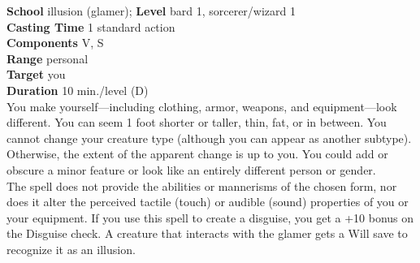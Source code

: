 \textbf{School} illusion (glamer); \textbf{Level} bard 1, sorcerer/wizard 1\\
\textbf{Casting Time} 1 standard action\\
\textbf{Components} V, S\\
\textbf{Range} personal\\
\textbf{Target} you\\
\textbf{Duration} 10 min./level (D)\\
You make yourself---including clothing, armor, weapons, and equipment---look different. You can seem 1 foot shorter or taller, thin, fat, or in between. You cannot change your creature type (although you can appear as another subtype). Otherwise, the extent of the apparent change is up to you. You could add or obscure a minor feature or look like an entirely different person or gender.\\
The spell does not provide the abilities or mannerisms of the chosen form, nor does it alter the perceived tactile (touch) or audible (sound) properties of you or your equipment. If you use this spell to create a disguise, you get a +10 bonus on the Disguise check. A creature that interacts with the glamer gets a Will save to recognize it as an illusion.\\
